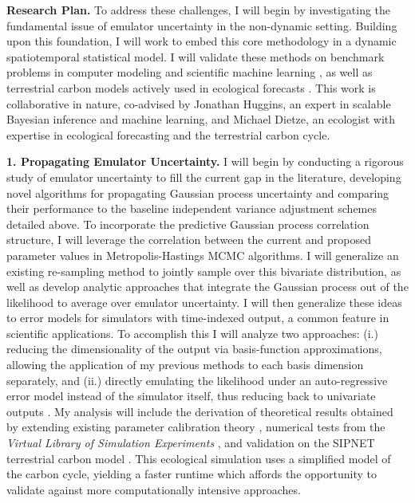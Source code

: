 \documentclass[11pt]{article}
\begin{document}


\noindent
\textbf{Research Plan.} To address these challenges, I will begin by investigating the fundamental issue of emulator uncertainty in the 
non-dynamic setting. Building upon this foundation, I will work to embed this core methodology in a dynamic spatiotemporal statistical model. I will validate these methods on benchmark problems in computer modeling and scientific machine learning \cite{Surjanovic, Takamoto}, as well as terrestrial carbon models actively used in ecological forecasts \cite{Dietze}. This work is collaborative in nature, co-advised by Jonathan Huggins, an expert in scalable Bayesian inference and machine learning, and Michael Dietze, an ecologist with expertise in ecological forecasting and the terrestrial carbon cycle. 
 
 \textbf{1. Propagating Emulator Uncertainty.} I will begin by conducting a rigorous study of emulator uncertainty to fill the current gap in the literature, developing novel algorithms for propagating Gaussian process uncertainty and comparing their performance to the baseline independent variance adjustment schemes detailed above. To incorporate the predictive Gaussian process correlation structure, I will leverage the correlation between the current and proposed parameter values in Metropolis-Hastings MCMC algorithms. I will generalize an existing re-sampling method \cite{Fer} to jointly sample over this bivariate distribution, as well as develop analytic approaches that integrate the Gaussian process out of the likelihood to average over emulator uncertainty. 
I will then generalize these ideas to error models for simulators with time-indexed output, a common feature in scientific applications. To accomplish this I will analyze two approaches: (i.) reducing the dimensionality of the output via basis-function 
 approximations, allowing the application of my previous methods to each basis dimension separately, and (ii.) directly emulating the likelihood under an auto-regressive error model instead of the simulator itself, thus reducing back to univariate outputs \cite{Fer}. 
 My analysis will include the derivation of theoretical results obtained by extending existing parameter calibration theory \cite{Tuo}, numerical tests from the 
 \textit{Virtual Library of Simulation Experiments} \cite{Surjanovic}, and validation on the SIPNET terrestrial carbon model \cite{Fer}. This ecological simulation uses a simplified model of the carbon cycle, yielding a faster runtime which affords the opportunity to validate against more computationally intensive approaches. 
\end{document}
